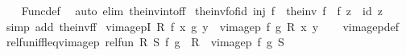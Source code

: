 \begin{isabellebody}
%
\isadelimproof
\ \ %
\endisadelimproof
%
\isatagproof
{}\isamarkupfalse%
\ Func{\isacharunderscore}{\kern0pt}def\ \isamarkupfalse%
\ {\isacharparenleft}{\kern0pt}auto\ elim{\isacharcolon}{\kern0pt}\ the{\isacharunderscore}{\kern0pt}inv{\isacharunderscore}{\kern0pt}into{\isacharunderscore}{\kern0pt}f{\isacharunderscore}{\kern0pt}f{\isacharparenright}{\kern0pt}%
\endisatagproof
{\isafoldproof}%
%
\isadelimproof
\isanewline
%
\endisadelimproof
\isanewline
{}\isamarkupfalse%
\ the{\isacharunderscore}{\kern0pt}inv{\isacharunderscore}{\kern0pt}f{\isacharunderscore}{\kern0pt}o{\isacharunderscore}{\kern0pt}f{\isacharunderscore}{\kern0pt}id{\isacharcolon}{\kern0pt}\ {\isachardoublequoteopen}inj\ f\ {\isasymLongrightarrow}\ {\isacharparenleft}{\kern0pt}the{\isacharunderscore}{\kern0pt}inv\ f\ {\isasymcirc}\ f{\isacharparenright}{\kern0pt}\ z\ {\isacharequal}{\kern0pt}\ id\ z{\isachardoublequoteclose}\isanewline
%
\isadelimproof
\ \ %
\endisadelimproof
%
\isatagproof
{}\isamarkupfalse%
\ {\isacharparenleft}{\kern0pt}simp\ add{\isacharcolon}{\kern0pt}\ the{\isacharunderscore}{\kern0pt}inv{\isacharunderscore}{\kern0pt}f{\isacharunderscore}{\kern0pt}f{\isacharparenright}{\kern0pt}%
\endisatagproof
{\isafoldproof}%
%
\isadelimproof
\isanewline
%
\endisadelimproof
\isanewline
{}\isamarkupfalse%
\ vimage{}pI{\isacharcolon}{\kern0pt}\ {\isachardoublequoteopen}R\ {\isacharparenleft}{\kern0pt}f\ x{\isacharparenright}{\kern0pt}\ {\isacharparenleft}{\kern0pt}g\ y{\isacharparenright}{\kern0pt}\ {\isasymLongrightarrow}\ vimage{}p\ f\ g\ R\ x\ y{\isachardoublequoteclose}\isanewline
%
\isadelimproof
\ \ %
\endisadelimproof
%
\isatagproof
{}\isamarkupfalse%
\ vimage{}p{\isacharunderscore}{\kern0pt}def\ \isacommand{{\isachardot}{\kern0pt}}\isamarkupfalse%
%
\endisatagproof
{\isafoldproof}%
%
\isadelimproof
\isanewline
%
\endisadelimproof
\isanewline
{}\isamarkupfalse%
\ rel{\isacharunderscore}{\kern0pt}fun{\isacharunderscore}{\kern0pt}iff{\isacharunderscore}{\kern0pt}leq{\isacharunderscore}{\kern0pt}vimage{}p{\isacharcolon}{\kern0pt}\ {\isachardoublequoteopen}{\isacharparenleft}{\kern0pt}rel{\isacharunderscore}{\kern0pt}fun\ R\ S{\isacharparenright}{\kern0pt}\ f\ g\ {\isacharequal}{\kern0pt}\ {\isacharparenleft}{\kern0pt}R\ {\isasymle}\ vimage{}p\ f\ g\ S{\isacharparenright}{\kern0pt}{\isachardoublequoteclose}\isanewline
%
\isadelimproof
\ \ %
\endisadelimproof
%
\isatagproof
{}\isamarkupfalse%

\end{isabellebody}
